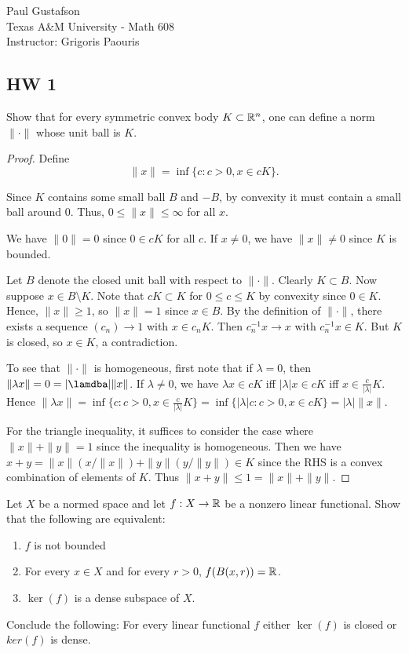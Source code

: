 \documentclass{article}
\begin{document}
\noindent Paul Gustafson\\
\noindent Texas A\&M University - Math 608 \\ 
\noindent Instructor: Grigoris Paouris

\subsection*{HW 1}
 Show that for every symmetric convex body $K \subset \mathbb{R}^n$, one can define a norm $\| \cdot \|$ whose unit ball is $K$.
\begin{proof}
Define $$\|x\| = \inf \{ c: c > 0, x \in cK \}.$$

Since $K$ contains some small ball $B$ and $-B$, by convexity it must contain a small ball around $0$.  Thus, $0 \le \|x\| \le \infty$ for all $x$.

We have $\|0\| =  0$ since $0 \in cK$ for all $c$.  If $x \neq 0$, we have $\|x\| \neq 0$ since $K$ is bounded.

Let $B$ denote the closed unit ball with respect to $\| \cdot \|$. Clearly $K \subset B$. Now suppose $x \in B \setminus K$.  Note that $cK \subset K$ for $0 \le c \le K$ by convexity since $0 \in K$. Hence, $\|x\| \ge 1$, so $\|x\| = 1$ since $x \in B$.  By the definition of $\|\cdot\|$, there exists a sequence $(c_n) \to 1$ with $x \in c_nK$. Then $c_n^{-1} x \to x$ with $c_n^{-1} x \in K$.  But $K$ is closed, so $x \in K$, a contradiction.

To see that $\| \cdot \|$ is homogeneous, first note that if $\lambda = 0$, then $\|\lambda x\| = 0 = |\lamdba| \|x\|$.  If $\lambda \neq 0$, we have $\lambda x \in cK$ iff $|\lambda|x \in cK$ iff $x \in \frac {c}{|\lambda|} K$. Hence $\|\lambda x\| = \inf \{ c: c > 0, x \in \frac{c}{|\lambda|}K \} = 
\inf \{ |\lambda| c: c > 0, x \in cK \} = |\lambda| \|x\|$.

For the triangle inequality, it suffices to consider the case where $\|x\| + \|y\| = 1$ since the inequality is homogeneous. Then we have
$x + y = \|x\| (x / \|x\|)  + \|y \| (y / \|y\|) \in K$ since the RHS is a convex combination of elements of $K$.  Thus $\|x + y\| \le 1 = \|x\| + \|y\|$.
\end{proof}

 Let $X$ be a normed space and let $f: X \to \mathbb{R}$ be a nonzero linear functional. Show that the following are equivalent:
\begin{enumerate}
\item $f$ is not bounded
\item For every $x \in X$ and for every $r > 0$, $f(B(x,r)) = \mathbb{R}$.
\item $\ker(f)$ is a dense subspace of $X$.
\end{enumerate}
Conclude the following: For every linear functional $f$ either $\ker(f)$ is closed or $ker(f)$ is dense. 
\end{document}

